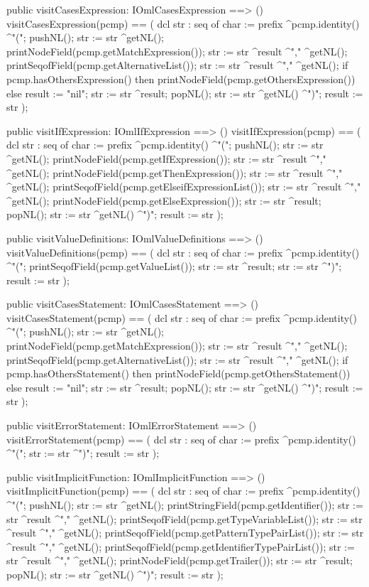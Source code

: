\begin{vdm_al}
  public visitCasesExpression: IOmlCasesExpression ==> ()
  visitCasesExpression(pcmp) ==
    ( dcl str : seq of char := prefix ^pcmp.identity() ^"(";
      pushNL();
      str := str ^getNL();
      printNodeField(pcmp.getMatchExpression());
      str := str ^result ^"," ^getNL();
      printSeqofField(pcmp.getAlternativeList());
      str := str ^result ^"," ^getNL();
      if pcmp.hasOthersExpression()
      then printNodeField(pcmp.getOthersExpression())
      else result := "nil";
      str := str ^result;
      popNL();
      str := str ^getNL() ^")";
      result := str );

  public visitIfExpression: IOmlIfExpression ==> ()
  visitIfExpression(pcmp) ==
    ( dcl str : seq of char := prefix ^pcmp.identity() ^"(";
      pushNL();
      str := str ^getNL();
      printNodeField(pcmp.getIfExpression());
      str := str ^result ^"," ^getNL();
      printNodeField(pcmp.getThenExpression());
      str := str ^result ^"," ^getNL();
      printSeqofField(pcmp.getElseifExpressionList());
      str := str ^result ^"," ^getNL();
      printNodeField(pcmp.getElseExpression());
      str := str ^result;
      popNL();
      str := str ^getNL() ^")";
      result := str );

  public visitValueDefinitions: IOmlValueDefinitions ==> ()
  visitValueDefinitions(pcmp) ==
    ( dcl str : seq of char := prefix ^pcmp.identity() ^"(";
      printSeqofField(pcmp.getValueList());
      str := str ^result;
      str := str ^")";
      result := str );

  public visitCasesStatement: IOmlCasesStatement ==> ()
  visitCasesStatement(pcmp) ==
    ( dcl str : seq of char := prefix ^pcmp.identity() ^"(";
      pushNL();
      str := str ^getNL();
      printNodeField(pcmp.getMatchExpression());
      str := str ^result ^"," ^getNL();
      printSeqofField(pcmp.getAlternativeList());
      str := str ^result ^"," ^getNL();
      if pcmp.hasOthersStatement()
      then printNodeField(pcmp.getOthersStatement())
      else result := "nil";
      str := str ^result;
      popNL();
      str := str ^getNL() ^")";
      result := str );

  public visitErrorStatement: IOmlErrorStatement ==> ()
  visitErrorStatement(pcmp) ==
    ( dcl str : seq of char := prefix ^pcmp.identity() ^"(";
      str := str ^")";
      result := str );

  public visitImplicitFunction: IOmlImplicitFunction ==> ()
  visitImplicitFunction(pcmp) ==
    ( dcl str : seq of char := prefix ^pcmp.identity() ^"(";
      pushNL();
      str := str ^getNL();
      printStringField(pcmp.getIdentifier());
      str := str ^result ^"," ^getNL();
      printSeqofField(pcmp.getTypeVariableList());
      str := str ^result ^"," ^getNL();
      printSeqofField(pcmp.getPatternTypePairList());
      str := str ^result ^"," ^getNL();
      printSeqofField(pcmp.getIdentifierTypePairList());
      str := str ^result ^"," ^getNL();
      printNodeField(pcmp.getTrailer());
      str := str ^result;
      popNL();
      str := str ^getNL() ^")";
      result := str );


\end{vdm_al}

